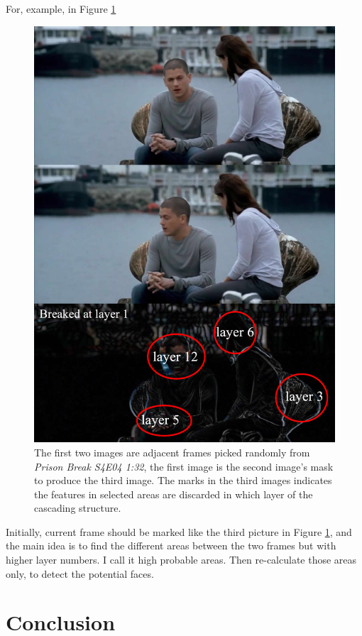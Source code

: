 \documentclass[10pt,twocolumn,letterpaper]{article}
\begin{document}
For, example, in Figure \ref{fig:ext}
\begin{figure}[t]
    \begin{center}
        \includegraphics[width=0.9\linewidth]{extension}
    \end{center}
    \caption{The first two images are adjacent frames picked randomly from \textit{Prison Break S4E04 1:32},
    the first image is the second image's mask to produce the third image.
    The marks in the third images indicates the features in selected areas are discarded in which layer of the cascading structure.}
    \label{fig:ext}
\end{figure}

Initially, current frame should be marked like the third picture in Figure \ref{fig:ext},
and the main idea is to find the different areas between the two frames but with higher layer numbers.
I call it high probable areas. Then re-calculate those areas only, to detect the potential faces.


\section{Conclusion}
\end{document}
